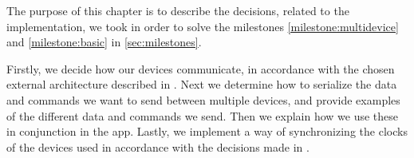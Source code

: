 The purpose of this chapter is to describe the decisions, related to the implementation, 
we took in order to solve the milestones \ref{milestone:multidevice} and \ref{milestone:basic} in \cref{sec:milestones}.

Firstly, we decide how our devices communicate, in accordance with the chosen external architecture described in .
Next we determine how to serialize the data and commands we want to send between multiple devices, and provide examples of the different data and commands we send.
Then we explain how we use these in conjunction in the app.
Lastly, we implement a way of synchronizing the clocks of the devices used in accordance with the decisions made in .
